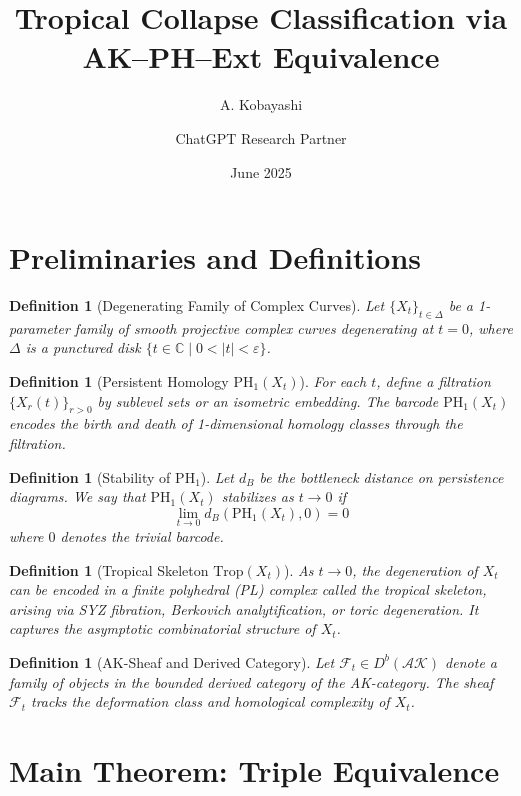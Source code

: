 \documentclass[11pt]{article}
\title{Tropical Collapse Classification via AK--PH--Ext Equivalence}
\author{A. Kobayashi \and ChatGPT Research Partner}
\date{June 2025}
\newtheorem{definition}[theorem]{Definition}
\begin{document}
\maketitle

\section{Preliminaries and Definitions}

\begin{definition}[Degenerating Family of Complex Curves]
Let $\{X_t\}_{t \in \Delta}$ be a 1-parameter family of smooth projective complex curves degenerating at $t=0$, where $\Delta$ is a punctured disk $\{ t \in \mathbb{C} \mid 0 < |t| < \varepsilon \}$.
\end{definition}

\begin{definition}[Persistent Homology $\mathrm{PH}_1(X_t)$]
For each $t$, define a filtration $\{X_r(t)\}_{r > 0}$ by sublevel sets or an isometric embedding. The barcode $\mathrm{PH}_1(X_t)$ encodes the birth and death of 1-dimensional homology classes through the filtration.
\end{definition}

\begin{definition}[Stability of $\mathrm{PH}_1$]
Let $d_B$ be the bottleneck distance on persistence diagrams. We say that $\mathrm{PH}_1(X_t)$ stabilizes as $t \to 0$ if
\[
\lim_{t \to 0} d_B(\mathrm{PH}_1(X_t), 0) = 0
\]
where $0$ denotes the trivial barcode.
\end{definition}

\begin{definition}[Tropical Skeleton $\mathrm{Trop}(X_t)$]
As $t \to 0$, the degeneration of $X_t$ can be encoded in a finite polyhedral (PL) complex called the tropical skeleton, arising via SYZ fibration, Berkovich analytification, or toric degeneration. It captures the asymptotic combinatorial structure of $X_t$.
\end{definition}

\begin{definition}[AK-Sheaf and Derived Category]
Let $\mathcal{F}_t \in D^b(\mathcal{AK})$ denote a family of objects in the bounded derived category of the AK-category. The sheaf $\mathcal{F}_t$ tracks the deformation class and homological complexity of $X_t$.
\end{definition}

\section{Main Theorem: Triple Equivalence}
\end{document}
